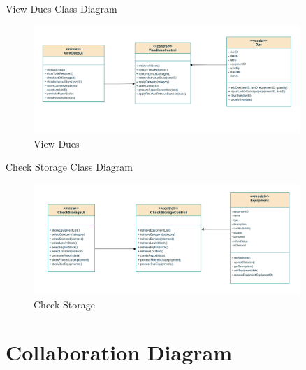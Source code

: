 \documentclass[20pt]{beamer}
\numberwithin{figure}{section}
\begin{document}
\begin{frame}{View Dues Class Diagram}

     \begin{figure}
        \centering
        \includegraphics[width= 0.9\textwidth , height= 0.4\paperheight]{ViewDuesUML.png}
        \caption{View Dues}
        \label{fig:15}
    \end{figure}

\end{frame}

\begin{frame}{Check Storage Class Diagram}

     \begin{figure}
        \centering
        \includegraphics[width= 0.9\textwidth , height= 0.4\paperheight]{CheckStorageUML.png}
        \caption{Check Storage}
        \label{fig:16}
    \end{figure}

\end{frame}

\section{Collaboration Diagram}
\end{document}
